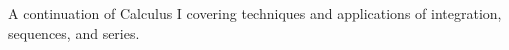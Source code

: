 \documentclass{syllabus}
\begin{document}
\maketitle

A continuation of Calculus I covering techniques and applications of
integration, sequences, and series.
\end{document}
